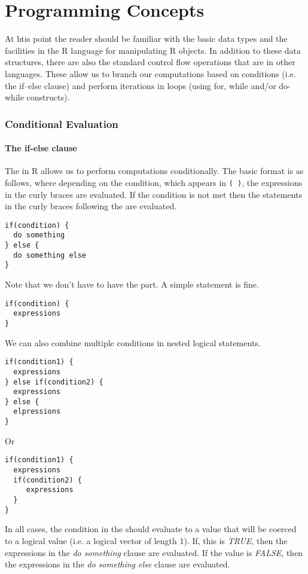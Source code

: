 \chapter{Programming Concepts}
\label{chap:RProgramming}

At htis point the reader should be familiar with the basic data types
and the facilities in the R language for manipulating R objects. In
addition to these data structures, there are also the standard control
flow operations that are in other languages. These allow us to branch
our computations based on conditions (i.e. the if--else clause) and
perform iterations in loops (using for, while and/or do-while
constructs).

\subsection{Conditional Evaluation}

\subsubsection{The if-else clause}
The  in R allows us to perform computations
conditionally.  The basic format is as follows, where depending on the
condition, which appears in \verb+( )+, the expressions in the curly
braces are evaluated.  If the condition is not met then the statements
in the curly braces following the  are evaluated.
\begin{verbatim}
if(condition) {
  do something
} else {
  do something else
}
\end{verbatim}
Note that we don't have to have the  part. A simple
 statement is fine.
\begin{verbatim}
if(condition) {
  expressions
}
\end{verbatim}

We can also combine multiple conditions in nested logical statements.
\begin{verbatim}
if(condition1) {
  expressions
} else if(condition2) {
  expressions
} else {
  elpressions
}
\end{verbatim}

Or
\begin{verbatim}
if(condition1) {
  expressions
  if(condition2) {
     expressions
  } 
}
\end{verbatim}

In all cases, the condition in the  should evaluate to a
value that will be coerced to a logical value (i.e. a logical vector
of length 1). If, this is \textsl{TRUE}, then the expressions in the
{\em{do something}} clause are evaluated. If the value is
\textsl{FALSE}, then the expressions in the {\em{do something else}}
clause are evaluated.

